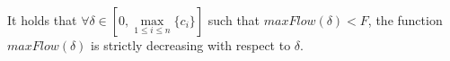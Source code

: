 \begin{lemma} \ \\
   \label{maxflowdec}
   It holds that $\forall \delta \in \left[0, \max\limits_{1 \leq i \leq n}{\{c_i\}}\right]$ such that
   $maxFlow\left(\delta\right) < F$, the function $maxFlow\left(\delta\right)$ is strictly decreasing with respect to
   $\delta$.
\end{lemma}
